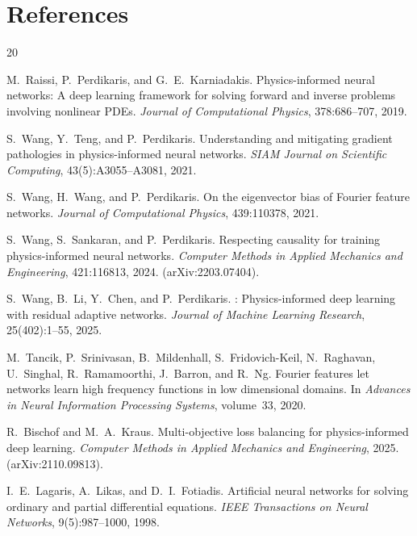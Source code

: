 \documentclass{article}
\begin{document}
\section*{References}
\begin{thebibliography}{20}

M.~Raissi, P.~Perdikaris, and G.~E.~Karniadakis.
\newblock Physics-informed neural networks: A deep learning framework for
  solving forward and inverse problems involving nonlinear {PDEs}.
\newblock \emph{Journal of Computational Physics}, 378:686--707, 2019.

S.~Wang, Y.~Teng, and P.~Perdikaris.
\newblock Understanding and mitigating gradient pathologies in
  physics-informed neural networks.
\newblock \emph{SIAM Journal on Scientific Computing}, 43(5):A3055--A3081,
  2021.

S.~Wang, H.~Wang, and P.~Perdikaris.
\newblock On the eigenvector bias of {Fourier} feature networks.
\newblock \emph{Journal of Computational Physics}, 439:110378, 2021.

S.~Wang, S.~Sankaran, and P.~Perdikaris.
\newblock Respecting causality for training physics-informed neural networks.
\newblock \emph{Computer Methods in Applied Mechanics and Engineering},
  421:116813, 2024.
\newblock (arXiv:2203.07404).

S.~Wang, B.~Li, Y.~Chen, and P.~Perdikaris.
: Physics-informed deep learning with residual adaptive
  networks.
\newblock \emph{Journal of Machine Learning Research}, 25(402):1--55, 2025.

M.~Tancik, P.~Srinivasan, B.~Mildenhall, S.~Fridovich-Keil, N.~Raghavan,
  U.~Singhal, R.~Ramamoorthi, J.~Barron, and R.~Ng.
\newblock Fourier features let networks learn high frequency functions in low
  dimensional domains.
\newblock In \emph{Advances in Neural Information Processing Systems},
  volume~33, 2020.

R.~Bischof and M.~A.~Kraus.
\newblock Multi-objective loss balancing for physics-informed deep learning.
\newblock \emph{Computer Methods in Applied Mechanics and Engineering}, 2025.
\newblock (arXiv:2110.09813).

I.~E.~Lagaris, A.~Likas, and D.~I.~Fotiadis.
\newblock Artificial neural networks for solving ordinary and partial
  differential equations.
\newblock \emph{IEEE Transactions on Neural Networks}, 9(5):987--1000, 1998.


\end{thebibliography}
\end{document}
